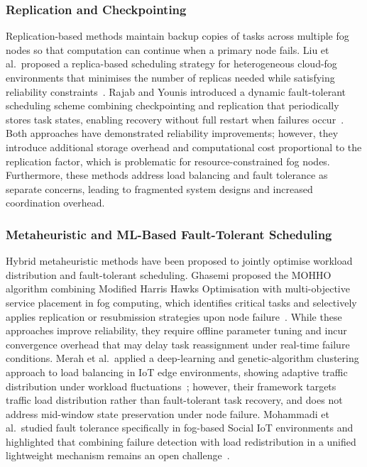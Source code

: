 \documentclass[conference]{IEEEtran}
\begin{document}
\subsubsection{Replication and Checkpointing}

Replication-based methods maintain backup copies of tasks across multiple fog nodes so that computation can continue when a primary node fails. Liu et al.\ proposed a replica-based scheduling strategy for heterogeneous cloud-fog environments that minimises the number of replicas needed while satisfying reliability constraints~\cite{liu2024}. Rajab and Younis introduced a dynamic fault-tolerant scheduling scheme combining checkpointing and replication that periodically stores task states, enabling recovery without full restart when failures occur~\cite{rajab2021}. Both approaches have demonstrated reliability improvements; however, they introduce additional storage overhead and computational cost proportional to the replication factor, which is problematic for resource-constrained fog nodes. Furthermore, these methods address load balancing and fault tolerance as separate concerns, leading to fragmented system designs and increased coordination overhead.

\subsubsection{Metaheuristic and ML-Based Fault-Tolerant Scheduling}

Hybrid metaheuristic methods have been proposed to jointly optimise workload distribution and fault-tolerant scheduling. Ghasemi proposed the MOHHO algorithm combining Modified Harris Hawks Optimisation with multi-objective service placement in fog computing, which identifies critical tasks and selectively applies replication or resubmission strategies upon node failure~\cite{ghasemi2024}. While these approaches improve reliability, they require offline parameter tuning and incur convergence overhead that may delay task reassignment under real-time failure conditions. Merah et al.\ applied a deep-learning and genetic-algorithm clustering approach to load balancing in IoT edge environments, showing adaptive traffic distribution under workload fluctuations~\cite{merah2025}; however, their framework targets traffic load distribution rather than fault-tolerant task recovery, and does not address mid-window state preservation under node failure. Mohammadi et al.\ studied fault tolerance specifically in fog-based Social IoT environments and highlighted that combining failure detection with load redistribution in a unified lightweight mechanism remains an open challenge~\cite{mohammadi2023}.
\end{document}
